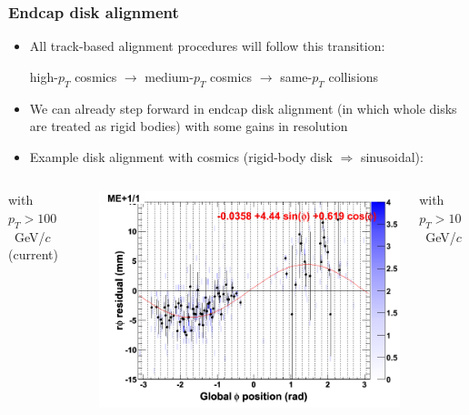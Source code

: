 \documentclass[compress]{beamer}
\begin{document}
\begin{frame}
\frametitle{Endcap disk alignment}
\begin{itemize}
\item All track-based alignment procedures will follow this transition:

high-$p_T$ cosmics \hspace{0.1 cm} $\to$ \hspace{0.1 cm} medium-$p_T$ cosmics \hspace{0.1 cm} $\to$ \hspace{0.1 cm} same-$p_T$ collisions

\item We can already step forward in endcap disk alignment (in which whole
  disks are treated as rigid bodies) with some gains in resolution

\item Example disk alignment with cosmics (rigid-body disk $\Rightarrow$ sinusoidal):
\end{itemize}

\vspace{-0.5 cm}
\begin{columns}
\begin{center}
with $p_T > 100$~GeV/$c$ (current)
\end{center}

\vspace{-0.25 cm}
\includegraphics[width=\linewidth]{endcap_highmomentum.png}

\begin{center}
with $p_T > 10$~GeV/$c$
\end{center}


\end{columns}
\end{frame}
\end{document}
